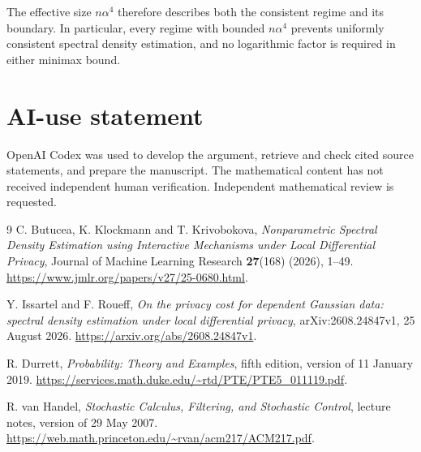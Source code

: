 \documentclass[11pt]{article}
\theoremstyle{remark}
\begin{document}
The effective size $n\alpha^4$ therefore describes both the consistent
regime and its boundary. In particular, every regime with bounded
$n\alpha^4$ prevents uniformly consistent spectral density estimation,
and no logarithmic factor is required in either minimax bound.

\section*{AI-use statement}
OpenAI Codex was used to develop the argument, retrieve and check cited
source statements, and prepare the manuscript. The mathematical content has
not received independent human verification. Independent mathematical review
is requested.

\begin{thebibliography}{9}
C. Butucea, K. Klockmann and T. Krivobokova,
\emph{Nonparametric Spectral Density Estimation using Interactive Mechanisms
under Local Differential Privacy}, Journal of Machine Learning Research
\textbf{27}(168) (2026), 1--49.
\url{https://www.jmlr.org/papers/v27/25-0680.html}.

Y. Issartel and F. Roueff,
\emph{On the privacy cost for dependent Gaussian data: spectral density
estimation under local differential privacy}, arXiv:2608.24847v1,
25 August 2026.
\url{https://arxiv.org/abs/2608.24847v1}.

R. Durrett, \emph{Probability: Theory and Examples}, fifth edition,
version of 11 January 2019.
\url{https://services.math.duke.edu/~rtd/PTE/PTE5_011119.pdf}.

R. van Handel, \emph{Stochastic Calculus, Filtering, and Stochastic Control},
lecture notes, version of 29 May 2007.
\url{https://web.math.princeton.edu/~rvan/acm217/ACM217.pdf}.
\end{thebibliography}
\end{document}
